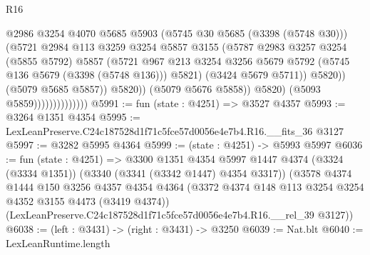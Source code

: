 \begin{lexlean}{R16}
\begin{coremodule}
                                          @2986
                                          @3254
                                          @4070
                                          @5685
                                          @5903
                                          (@5745 @30 @5685 (@3398 (@5748 @30)))
                                          (@5721
                                            @2984
                                            @113
                                            @3259
                                            @3254
                                            @5857
                                            @3155
                                            (@5787
                                              @2983
                                              @3257
                                              @3254
                                              (@5855 @5792)
                                              @5857
                                              (@5721
                                                @967
                                                @213
                                                @3254
                                                @3256
                                                @5679
                                                @5792
                                                (@5745 @136 @5679 (@3398 (@5748 @136)))
                                                @5821)
                                              (@3424 @5679 @5711))
                                            @5820))
                                        (@5079 @5685 @5857))
                                      @5820))
                                  (@5079 @5676 @5858))
                                @5820)
                              (@5093 @5859))))))))))))))
@5991 := fun (state : @4251) => @3527 @4357
@5993 := @3264 @1351 @4354
@5995 := LexLeanPreserve.C24c187528d1f71c5fce57d0056e4e7b4.R16.__fits_36 @3127
@5997 := @3282 @5995 @4364
@5999 := (state : @4251) -> @5993 @5997
@6036 := fun (state : @4251) =>
  @3300
    @1351
    @4354
    @5997
    @1447
    @4374
    (@3324 (@3334 @1351))
    (@3340 (@3341 (@3342 @1447) @4354 @3317))
    (@3578
      @4374
      @1444
      @150
      @3256
      @4357
      @4354
      @4364
      (@3372 @4374 @148 @113 @3254 @3254 @4352 @3155 @4473 (@3419 @4374))
      (LexLeanPreserve.C24c187528d1f71c5fce57d0056e4e7b4.R16.__rel_39 @3127))
@6038 := (left : @3431) -> (right : @3431) -> @3250
@6039 := Nat.blt
@6040 := LexLeanRuntime.length

\end{coremodule}
\end{lexlean}
